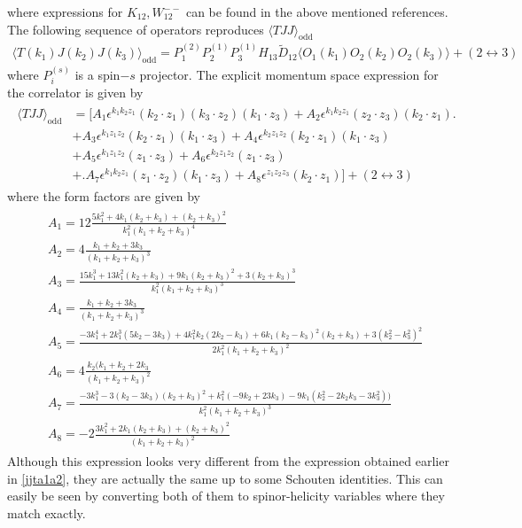 \documentclass[a4paper,11pt]{article}
\begin{document}
where expressions for $K_{12}, W_{12}^{--}$ can be found in the above mentioned references.
The following sequence of operators reproduces $\langle TJJ \rangle_{\text{odd}}$
\begin{align}
    \langle T(k_1)J(k_2)J(k_3) \rangle_{\text{odd}} = P_1^{(2)}P_2^{(1)}P_3^{(1)}H_{13}\widetilde{D}_{12}\langle O_1(k_1)O_2(k_2)O_2(k_3) \rangle+(2 \leftrightarrow 3)
\end{align}
where $P_i^{(s)}$ is a spin$-s$ projector. 
The explicit momentum space expression for the correlator is given by
\begin{align}
\begin{split}
    \langle TJJ \rangle_{\text{odd}} &= \bigg[A_1\epsilon^{k_1 k_2 z_1}(k_2 \cdot z_1)(k_3 \cdot z_2)(k_1 \cdot z_3)+A_2 \epsilon^{k_1 k_2 z_1}(z_2 \cdot z_3)(k_2 \cdot z_1)\bigg.\\
    &+A_3 \epsilon^{k_1 z_1 z_2}(k_2 \cdot z_1)(k_1 \cdot z_3)+A_4 \epsilon^{k_2 z_1 z_2}(k_2 \cdot z_1)(k_1 \cdot z_3)\\
    &+A_5 \epsilon^{k_1 z_1 z_2}(z_1 \cdot z_3)+A_6 \epsilon^{k_2 z_1 z_2}(z_1 \cdot z_3)\\
    &+\bigg.A_7\epsilon^{k_1 k_2 z_1}(z_1 \cdot z_2)(k_1 \cdot z_3)+A_8 \epsilon^{z_1 z_2 z_3}(k_2 \cdot z_1)\bigg]+(2 \leftrightarrow 3)
    \end{split}
\end{align}
where the form factors are given by
\begin{align}
    \begin{split}
    &A_1 = 12\frac{5k_1^2+4k_1(k_2+k_3)+(k_2+k_3)^2}{k_1^2(k_1+k_2+k_3)^4}\\[5 pt]
    &A_2 = 4\frac{k_1 +k_2 +3k_3}{(k_1+k_2+k_3)^3}\\[5 pt]
    &A_3 = \frac{15k_1^3+13k_1^2(k_2+k_3)+9k_1(k_2+k_3)^2+3(k_2+k_3)^3}{k_1^2(k_1+k_2+k_3)^3}\\[5 pt]
    &A_4 = \frac{k_1+k_2+3k_3}{(k_1+k_2+k_3)^3}\\[5 pt]
    &A_5 = \frac{-3k_1^4+2k_1^3(5k_2-3k_3)+4k_1^2k_2(2k_2-k_3)+6k_1(k_2-k_3)^2(k_2+k_3)+3(k_2^2-k_3^2)^2}{2k_1^2(k_1+k_2+k_3)^2}\\[5 pt]
    &A_6= 4\frac{k_2(k_1+k_2+2k_3}{(k_1+k_2+k_3)^2}\\[5 pt]
    &A_7 = \frac{-3k_1^3-3(k_2-3k_3)(k_2+k_3)^2+k_1^2(-9k_2+23k_3)-9k_1(k_2^2-2k_2k_3-3k_3^2))}{k_1^2(k_1+k_2+k_3)^3}\\[5 pt]
    &A_8 = -2\frac{3k_1^2+2k_1(k_2+k_3)+(k_2+k_3)^2}{(k_1+k_2+k_3)^2}
    \end{split}
\end{align}
Although this expression looks very different from the expression obtained earlier in \eqref{jjta1a2}, they are actually the same up to some Schouten identities. This can easily be seen by converting both of them to spinor-helicity variables where they match exactly. 
\end{document}
